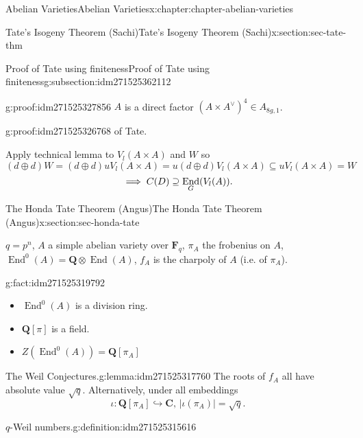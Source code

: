 \documentclass[oneside,10pt,]{book}
\newcommand{\qedhere}{\relax}
\numberwithin{equation}{section}
\newcommand{\lb}{[}
\newcommand{\rb}{]}
\newcommand{\QQ}{\mathbf{Q}}
\newcommand{\CC}{\mathbf{C}}
\newcommand{\FF}{\mathbf{F}}
\DeclareMathOperator{\End}{End}
\begin{document}
\begin{chapterptx}{Abelian Varieties}{}{Abelian Varieties}{}{}{x:chapter:chapter-abelian-varieties}
\begin{sectionptx}{Tate's Isogeny Theorem (Sachi)}{}{Tate's Isogeny Theorem (Sachi)}{}{}{x:section:sec-tate-thm}
\begin{subsectionptx}{Proof of Tate using finiteness}{}{Proof of Tate using finiteness}{}{}{g:subsection:idm271525362112}
\begin{proofptx}{}{g:proof:idm271525327856}
\(A\) is a direct factor \((A\times A^\vee)^4 \in A_{8g,1}\).%
\end{proofptx}
\begin{proofptx}{}{g:proof:idm271525326768}
of Tate.%
\par
Apply technical lemma to \(V_l(A\times A)\) and \(W\) so%
\begin{equation*}
(d\oplus d) W = (d \oplus d) uV_l(A\times A) = u(d\oplus d) V_l(A\times A) \subseteq uV_l(A\times A) = W
\end{equation*}
%
\begin{equation*}
\implies C(D) \supseteq \End_G(V_l(A))\text{.}\qedhere
\end{equation*}
%
\end{proofptx}
\end{subsectionptx}
\end{sectionptx}
%
%
\typeout{************************************************}
\typeout{************************************************}
%
\begin{sectionptx}{The Honda Tate Theorem (Angus)}{}{The Honda Tate Theorem (Angus)}{}{}{x:section:sec-honda-tate}
\begin{introduction}{}%
\(q = p^n\), \(A\) a simple abelian variety over \(\FF_q\), \(\pi_A\) the frobenius on \(A\), \(\End^0(A) = \QQ\otimes \End(A)\), \(f_A\) is the charpoly of \(A\) (i.e. of \(\pi_A\)).%
\begin{fact}{}{}{g:fact:idm271525319792}%
%
\begin{itemize}[label=\textbullet]
\item{}\(\End^0(A)\) is a division ring.%
\item{}\(\QQ\lb \pi\rb\) is a field.%
\item{}\(Z(\End^0(A)) = \QQ\lb \pi_A\rb\)%
\end{itemize}
%
\end{fact}
\begin{lemma}{The Weil Conjectures.}{}{g:lemma:idm271525317760}%
The roots of \(f_A\) all have absolute value \(\sqrt q\). Alternatively, under all embeddings%
\begin{equation*}
\iota \colon \QQ\lb \pi_A\rb \hookrightarrow \CC,\,|\iota(\pi_A)| = \sqrt q\text{.}
\end{equation*}
%
\end{lemma}
\begin{definition}{\(q\)-Weil numbers.}{g:definition:idm271525315616}%

\end{definition}
\end{introduction}
\end{sectionptx}
\end{chapterptx}
\end{document}
